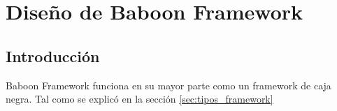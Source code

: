 \section{Diseño de Baboon Framework}

\subsection{Introducción}
Baboon Framework funciona en su mayor parte como un framework de caja negra.
Tal como se explicó en la sección \autoref{sec:tipos_framework}